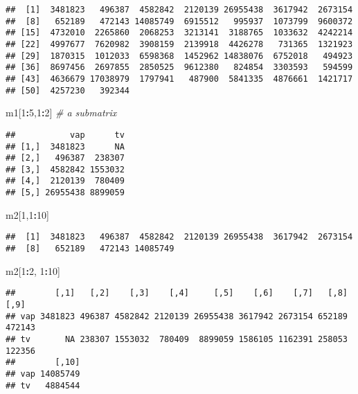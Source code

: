 \documentclass[]{article}
\newenvironment{Shaded}{\begin{snugshade}}{\end{snugshade}}
\newcommand{\DecValTok}[1]{\textcolor[rgb]{0.00,0.00,0.81}{#1}}
\newcommand{\CommentTok}[1]{\textcolor[rgb]{0.56,0.35,0.01}{\textit{#1}}}
\newcommand{\OperatorTok}[1]{\textcolor[rgb]{0.81,0.36,0.00}{\textbf{#1}}}
\newcommand{\NormalTok}[1]{#1}
\begin{document}
\begin{verbatim}
##  [1]  3481823   496387  4582842  2120139 26955438  3617942  2673154
##  [8]   652189   472143 14085749  6915512   995937  1073799  9600372
## [15]  4732010  2265860  2068253  3213141  3188765  1033632  4242214
## [22]  4997677  7620982  3908159  2139918  4426278   731365  1321923
## [29]  1870315  1012033  6598368  1452962 14838076  6752018   494923
## [36]  8697456  2697855  2850525  9612380   824854  3303593   594599
## [43]  4636679 17038979  1797941   487900  5841335  4876661  1421717
## [50]  4257230   392344
\end{verbatim}

\begin{Shaded}
\begin{Highlighting}[]
\NormalTok{m1[}\DecValTok{1}\OperatorTok{:}\DecValTok{5}\NormalTok{,}\DecValTok{1}\OperatorTok{:}\DecValTok{2}\NormalTok{] }\CommentTok{# a submatrix}
\end{Highlighting}
\end{Shaded}

\begin{verbatim}
##           vap      tv
## [1,]  3481823      NA
## [2,]   496387  238307
## [3,]  4582842 1553032
## [4,]  2120139  780409
## [5,] 26955438 8899059
\end{verbatim}

\begin{Shaded}
\begin{Highlighting}[]
\NormalTok{m2[}\DecValTok{1}\NormalTok{,}\DecValTok{1}\OperatorTok{:}\DecValTok{10}\NormalTok{]}
\end{Highlighting}
\end{Shaded}

\begin{verbatim}
##  [1]  3481823   496387  4582842  2120139 26955438  3617942  2673154
##  [8]   652189   472143 14085749
\end{verbatim}

\begin{Shaded}
\begin{Highlighting}[]
\NormalTok{m2[}\DecValTok{1}\OperatorTok{:}\DecValTok{2}\NormalTok{, }\DecValTok{1}\OperatorTok{:}\DecValTok{10}\NormalTok{]}
\end{Highlighting}
\end{Shaded}

\begin{verbatim}
##        [,1]   [,2]    [,3]    [,4]     [,5]    [,6]    [,7]   [,8]   [,9]
## vap 3481823 496387 4582842 2120139 26955438 3617942 2673154 652189 472143
## tv       NA 238307 1553032  780409  8899059 1586105 1162391 258053 122356
##        [,10]
## vap 14085749
## tv   4884544
\end{verbatim}
\end{document}
